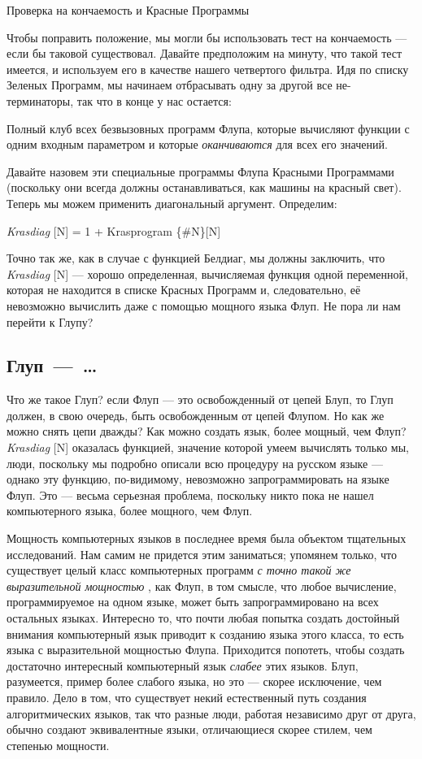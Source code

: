 \documentclass[../main.tex]{subfiles}
\begin{document}
Проверка на кончаемость и Красные Программы

Чтобы поправить положение, мы могли бы использовать тест на кончаемость --- если бы таковой существовал. Давайте предположим на минуту, что такой тест имеется, и используем его в качестве нашего четвертого фильтра. Идя по списку Зеленых Программ, мы начинаем отбрасывать одну за другой все не-терминаторы, так что в конце у нас остается:

Полный клуб всех безвызовных программ Флупа, которые вычисляют функции с одним входным параметром и которые \emph{оканчиваются} для всех его значений.

Давайте назовем эти специальные программы Флупа Красными Программами (поскольку они всегда должны останавливаться, как машины на красный свет). Теперь мы можем применить диагональный аргумент. Определим:

\emph{Krasdiag} {[}N{]} = 1 + Krasprogram \{\#N\}{[}N{]}

Точно так же, как в случае с функцией Белдиаг, мы должны заключить, что \emph{Krasdiag} {[}N{]} --- хорошо определенная, вычисляемая функция одной переменной, которая не находится в списке Красных Программ и, следовательно, её невозможно вычислить даже с помощью мощного языка Флуп. Не пора ли нам перейти к Глупу?


\subsection{Глуп~---~\ldots{}}

Что же такое Глуп? если Флуп --- это освобожденный от цепей Блуп, то Глуп должен, в свою очередь, быть освобожденным от цепей Флупом. Но как же можно снять цепи дважды? Как можно создать язык, более мощный, чем Флуп? \emph{Krasdiag} {[}N{]} оказалась функцией, значение которой умеем вычислять только мы, люди, поскольку мы подробно описали всю процедуру на русском языке --- однако эту функцию, по-видимому, невозможно запрограммировать на языке Флуп. Это --- весьма серьезная проблема, поскольку никто пока не нашел компьютерного языка, более мощного, чем Флуп.

Мощность компьютерных языков в последнее время была объектом тщательных исследований. Нам самим не придется этим заниматься; упомянем только, что существует целый класс компьютерных программ \emph{с точно такой же выразительной мощностью} , как Флуп, в том смысле, что любое вычисление, программируемое на одном языке, может быть запрограммировано на всех остальных языках. Интересно то, что почти любая попытка создать достойный внимания компьютерный язык приводит к созданию языка этого класса, то есть языка с выразительной мощностью Флупа. Приходится попотеть, чтобы создать достаточно интересный компьютерный язык \emph{слабее} этих языков. Блуп, разумеется, пример более слабого языка, но это --- скорее исключение, чем правило. Дело в том, что существует некий естественный путь создания алгоритмических языков, так что разные люди, работая независимо друг от друга, обычно создают эквивалентные языки, отличающиеся скорее стилем, чем степенью мощности.
\end{document}

